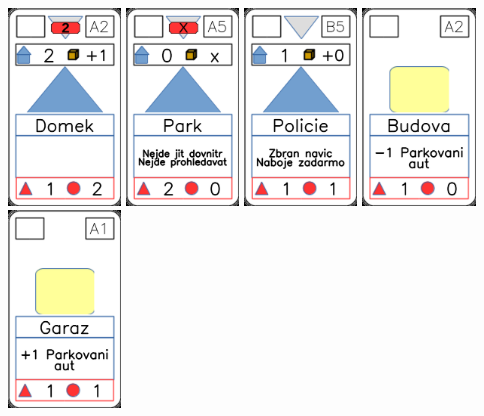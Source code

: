 \documentclass[a4paper]{article}
\begin{document}
	\includegraphics[width=3.0cm]{img-3_1}
	\includegraphics[width=3.0cm]{img-3_19}
	\includegraphics[width=3.0cm]{img-3_9}
	\includegraphics[width=3.0cm]{img-2_1}
	\includegraphics[width=3.0cm]{img-2_15}
\end{document}
